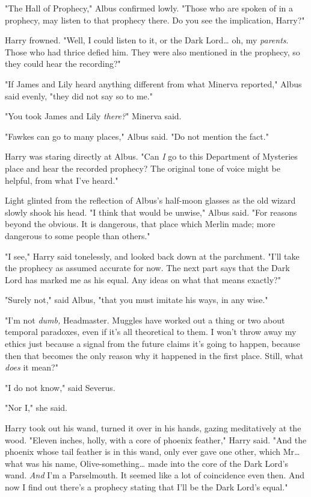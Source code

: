 "The Hall of Prophecy," Albus confirmed lowly. "Those who are spoken of in a prophecy, may listen to that prophecy there. Do you see the implication, Harry?"

Harry frowned. "Well, I could listen to it, or the Dark Lord{\ldots} oh, my \emph{parents}. Those who had thrice defied him. They were also mentioned in the prophecy, so they could hear the recording?"

"If James and Lily heard anything different from what Minerva reported," Albus said evenly, "they did not say so to me."

"You took James and Lily \emph{there?}" Minerva said.

"Fawkes can go to many places," Albus said. "Do not mention the fact."

Harry was staring directly at Albus. "Can \emph{I} go to this Department of Mysteries place and hear the recorded prophecy? The original tone of voice might be helpful, from what I've heard."

Light glinted from the reflection of Albus's half-moon glasses as the old wizard slowly shook his head. "I think that would be unwise," Albus said. "For reasons beyond the obvious. It is dangerous, that place which Merlin made; more dangerous to some people than others."

"I see," Harry said tonelessly, and looked back down at the parchment. "I'll take the prophecy as assumed accurate for now. The next part says that the Dark Lord has marked me as his equal. Any ideas on what that means exactly?"

"Surely not," said Albus, "that you must imitate his ways, in any wise."

"I'm not \emph{dumb,} Headmaster. Muggles have worked out a thing or two about temporal paradoxes, even if it's all theoretical to them. I won't throw away my ethics just because a signal from the future claims it's going to happen, because then that becomes the only reason why it happened in the first place. Still, what \emph{does} it mean?"

"I do not know," said Severus.

"Nor I," she said.

Harry took out his wand, turned it over in his hands, gazing meditatively at the wood. "Eleven inches, holly, with a core of phoenix feather," Harry said. "And the phoenix whose tail feather is in this wand, only ever gave one other, which Mr{\ldots} what was his name, Olive-something{\ldots} made into the core of the Dark Lord's wand. \emph{And} I'm a Parselmouth. It seemed like a lot of coincidence even then. And now I find out there's a prophecy stating that I'll be the Dark Lord's equal."

